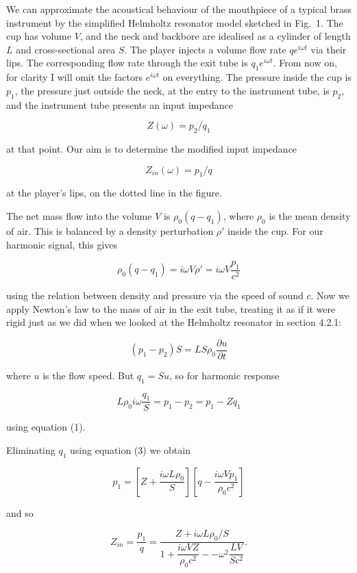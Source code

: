   We can approximate the acoustical behaviour of the mouthpiece of a typical 
  brass instrument by the simplified Helmholtz resonator model sketched in 
  Fig.\ 1. The cup has volume $V$, and the neck and backbore are idealised as a 
  cylinder of length $L$ and cross-sectional area $S$. The player injects a 
  volume flow rate $qe^{i \omega t}$ via their lips. The corresponding flow 
  rate through the exit tube is $q_1e^{i \omega t}$. From now on, for clarity I 
  will omit the factors $e^{i \omega t}$ on everything. The pressure inside the 
  cup is $p_1$, the pressure just outside the neck, at the entry to the 
  instrument tube, is $p_2$, and the instrument tube presents an input 
  impedance 

  $$Z(\omega)=p_2/q_1 \tag{1}$$ 

  at that point. Our aim is to determine the modified input impedance 

  $$Z_{in}(\omega)=p_1/q \tag{2}$$ 

  at the player's lips, on the dotted line in the figure. 

  The net mass flow into the volume $V$ is $\rho_0 (q-q_1)$, where $\rho_0$ is 
  the mean density of air. This is balanced by a density perturbation $\rho'$ 
  inside the cup. For our harmonic signal, this gives 

  $$\rho_0(q-q_1)=i \omega V \rho' = i \omega V \dfrac{p_1}{c^2} \tag{3}$$ 

  using the relation between density and pressure via the speed of sound $c$. 
  Now we apply Newton's law to the mass of air in the exit tube, treating it as 
  if it were rigid just as we did when we looked at the Helmholtz resonator in 
  section 4.2.1: 

  $$(p_1-p_2) S = L S \rho_0 \dfrac{\partial u}{\partial t} \tag{4}$$ 

  where $u$ is the flow speed. But $q_1 = Su$, so for harmonic response 

  $$L \rho_0 i \omega \dfrac{q_1}{S}=p_1-p_2 = p_1 -Zq_1 \tag{5}$$ 

  using equation (1). 

  Eliminating $q_1$ using equation (3) we obtain 

  $$p_1=\left[ Z+\dfrac{i \omega L \rho_0}{S} \right] \left[ q-\dfrac{i \omega 
  V p_1}{\rho_0 c^2} \right] \tag{6}$$ 

  and so 

  $$Z_{in} =\dfrac{p_1}{q}=\dfrac{Z+i \omega L \rho_0/S}{1+ \dfrac{i \omega V 
  Z}{\rho_0 c^2} -- \omega^2 \dfrac{LV}{Sc^2}} . \tag{7}$$ 


